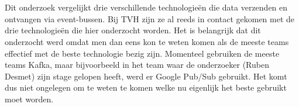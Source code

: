 
%
%

%



\chapter*{}
Dit onderzoek vergelijkt drie verschillende technologieën die data verzenden en ontvangen via event-bussen. Bij TVH zijn ze al reeds in contact gekomen met de drie technologieën die hier onderzocht worden. Het is belangrijk dat dit onderzocht werd omdat men dan eens kon te weten komen als de meeste teams effectief met de beste technologie bezig zijn. Momenteel gebruiken de meeste teams Kafka, maar bijvoorbeeld in het team waar de onderzoeker (Ruben Desmet) zijn stage gelopen heeft, werd er Google Pub/Sub gebruikt. Het komt dus niet ongelegen om te weten te komen welke nu eigenlijk het beste gebruikt moet worden.

